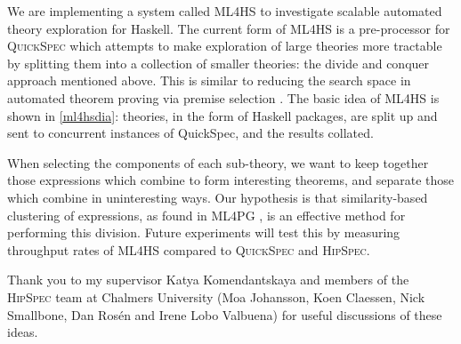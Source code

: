\documentclass{eceasst}
\begin{document}
We are implementing a system called \textsc{ML4HS} to investigate scalable
automated theory exploration for Haskell. The current form of \textsc{ML4HS} is
a pre-processor for \textsc{QuickSpec} which attempts to make exploration of
large theories more tractable by splitting them into a collection of smaller
theories: the divide and conquer approach mentioned above. This is
similar to reducing the search space in automated theorem proving via premise
selection \cite{kuhlwein2012overview}. The basic idea of \textsc{ML4HS} is shown
in \autoref{ml4hsdia}: theories, in the form of Haskell packages, are split up
and sent to concurrent instances of QuickSpec, and the results collated.

When selecting the components of each sub-theory, we want to keep together those
expressions which combine to form interesting theorems, and separate those which
combine in uninteresting ways. Our hypothesis is that similarity-based
clustering of expressions, as found in \textsc{ML4PG}
\cite{journals/corr/abs-1302-6421}, is an effective method for performing this
division. Future experiments will test this by measuring throughput rates of
\textsc{ML4HS} compared to \textsc{QuickSpec} and \textsc{HipSpec}.

\begin{acknowledge}
Thank you to my supervisor Katya Komendantskaya and members of the
\textsc{HipSpec} team at Chalmers University (Moa Johansson, Koen Claessen, Nick
Smallbone, Dan Ros{\'e}n and Irene Lobo Valbuena) for useful discussions of these
ideas.
\end{acknowledge}



\end{document}

